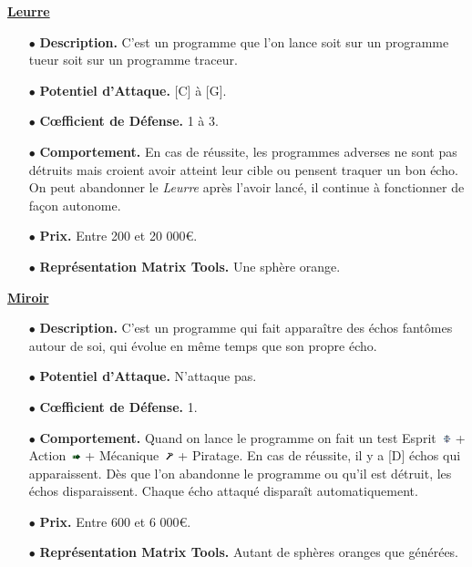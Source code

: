 \documentclass[11pt,twoside,a4paper]{article}
\def\imgESPRI{\includegraphics[width=0.25cm]{../../../../../imgGraphics/rolePlayingGame/SimulacreS/mini12x12/esprit.png} }
\def\imgACTIO{\includegraphics[width=0.25cm]{../../../../../imgGraphics/rolePlayingGame/SimulacreS/mini12x12/action.png} }
\def\imgMECAN{\includegraphics[width=0.25cm]{../../../../../imgGraphics/rolePlayingGame/SimulacreS/mini12x12/mecanique.png} }
\begin{document}
\begin{multicols*}{2}
\underline{\textbf{Leurre}} %
\begin{itemize}
	\item[$\bullet$] \textbf{Description. }C'est un programme que l'on lance soit sur un programme tueur soit sur un programme traceur. 
	\item[$\bullet$] \textbf{Potentiel d'Attaque. }[C] {\`a} [G]. 
	\item[$\bullet$] \textbf{C\oe fficient de D{\'e}fense. }1 {\`a} 3. 
	\item[$\bullet$] \textbf{Comportement. }En cas de r{\'e}ussite, les programmes adverses ne sont pas d{\'e}truits mais croient avoir atteint leur cible ou pensent traquer un bon {\'e}cho. On peut abandonner le \emph{Leurre} apr{\`e}s l'avoir lanc{\'e}, il continue {\`a} fonctionner de fa\c{c}on autonome. 
	\item[$\bullet$] \textbf{Prix. }Entre 200 et 20 000\euro . 
	\item[$\bullet$] \textbf{Repr{\'e}sentation Matrix Tools. }Une sph{\`e}re orange. 
\end{itemize} %

\underline{\textbf{Miroir}} %
\begin{itemize}
	\item[$\bullet$] \textbf{Description. }C'est un programme qui fait appara{\^i}tre des {\'e}chos fant{\^o}mes autour de soi, qui {\'e}volue en m{\^e}me temps que son propre {\'e}cho. 
	\item[$\bullet$] \textbf{Potentiel d'Attaque. }N'attaque pas. 
	\item[$\bullet$] \textbf{C\oe fficient de D{\'e}fense. }1. 
	\item[$\bullet$] \textbf{Comportement. }Quand on lance le programme on fait un test Esprit~\imgESPRI  + Action~\imgACTIO  + M{\'e}canique~\imgMECAN  + Piratage. En cas de r{\'e}ussite, il y a [D] {\'e}chos qui apparaissent. D{\`e}s que l'on abandonne le programme ou qu'il est d{\'e}truit, les {\'e}chos disparaissent. Chaque {\'e}cho attaqu{\'e} dispara{\^i}t automatiquement. 
	\item[$\bullet$] \textbf{Prix. }Entre 600 et 6 000\euro . 
	\item[$\bullet$] \textbf{Repr{\'e}sentation Matrix Tools. }Autant de sph{\`e}res oranges que g{\'e}n{\'e}r{\'e}es. 
\end{itemize} %


\end{multicols*}
\end{document}

